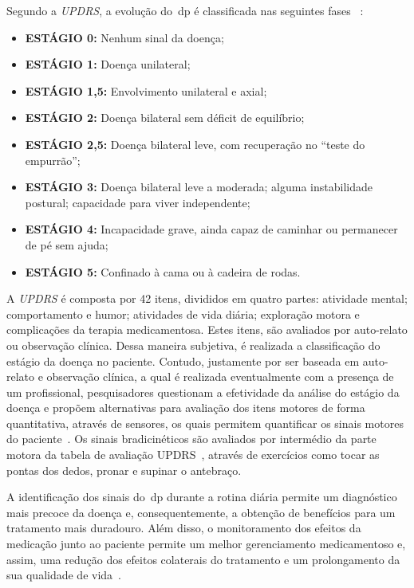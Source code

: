Segundo a \textit{UPDRS}, a evolução do~\ac{dp} é classificada nas seguintes fases ~\cite{updrs87}:
  \begin{itemize}
    \item \textbf{ESTÁGIO 0:} Nenhum sinal da doença;
    \item \textbf{ESTÁGIO 1:} Doença unilateral;
    \item \textbf{ESTÁGIO 1,5:} Envolvimento unilateral e axial;
    \item \textbf{ESTÁGIO 2:} Doença bilateral sem déficit de equilíbrio;
    \item \textbf{ESTÁGIO 2,5:} Doença bilateral leve, com recuperação no “teste do empurrão”;
    \item \textbf{ESTÁGIO 3:} Doença bilateral leve a moderada; alguma instabilidade postural; capacidade para viver independente;
    \item \textbf{ESTÁGIO 4:} Incapacidade grave, ainda capaz de caminhar ou permanecer de pé sem ajuda;
    \item \textbf{ESTÁGIO 5:} Confinado à cama ou à cadeira de rodas.
  \end{itemize}

A \textit{UPDRS} é composta por 42 itens, divididos em quatro partes: atividade mental; comportamento e humor; atividades de vida diária; exploração motora e complicações da terapia medicamentosa. Estes itens, são avaliados por auto-relato ou observação clínica. Dessa maneira subjetiva, é realizada a classificação do estágio da doença no paciente. Contudo, justamente por ser baseada em auto-relato e observação clínica, a qual é realizada eventualmente com a presença de um profissional, pesquisadores questionam a efetividade da análise do estágio da doença e propõem alternativas para avaliação dos itens motores de forma quantitativa, através de sensores, os quais permitem quantificar os sinais motores do paciente~\cite{kostek12,synnott_wiipd_2012,patel_monitoring_2009}. Os sinais bradicinéticos são avaliados por intermédio da parte motora da tabela de avaliação UPDRS~\cite{updrs87}, através de exercícios como tocar as pontas dos dedos, pronar e supinar o antebraço.

A identificação dos sinais do~\ac{dp} durante a rotina diária permite um diagnóstico mais precoce da doença e, consequentemente, a obtenção de benefícios para um tratamento mais duradouro. Além disso, o monitoramento dos efeitos da medicação junto ao paciente permite um melhor gerenciamento medicamentoso e, assim, uma redução dos efeitos colaterais do tratamento e um prolongamento da sua qualidade de vida~\cite{rowlandtratado}.


